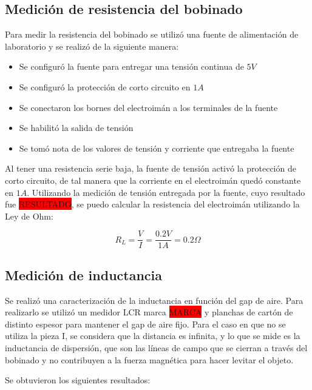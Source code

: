 \subsection{Medición de resistencia del bobinado}

\noindent Para medir la resistencia del bobinado se utilizó una fuente de alimentación de laboratorio y se realizó de la siguiente manera:

\begin{itemize}
	\item Se configuró la fuente para entregar una tensión continua de $5V$
	\item Se configuró la protección de corto circuito en $1A$
	\item Se conectaron los bornes del electroimán a los terminales de la fuente
	\item Se habilitó la salida de tensión
	\item Se tomó nota de los valores de tensión y corriente que entregaba la fuente
\end{itemize}

\noindent Al tener una resistencia serie baja, la fuente de tensión activó la protección de corto circuito, de tal manera que la corriente en el electroimán quedó constante en $1A$. Utilizando la medición de tensión entregada por la fuente, cuyo resultado fue \colorbox{red}{RESULTADO}, se puedo calcular la resistencia del electroimán utilizando la Ley de Ohm:

\begin{equation}
	R_{L}=\frac{V}{I}=\frac{0.2V}{1A}=0.2\Omega
\end{equation}

\subsection{Medición de inductancia}

\noindent Se realizó una caracterización de la inductancia en función del gap de aire. Para realizarlo se utilizó un medidor LCR marca \colorbox{red}{MARCA} y planchas de cartón de distinto espesor para mantener el gap de aire fijo. Para el caso en que no se utiliza la pieza I, se considera que la distancia es infinita, y lo que se mide es la inductancia de dispersión, que son las líneas de campo que se cierran a través del bobinado y no contribuyen a la fuerza magnética para hacer levitar el objeto.

\noindent Se obtuvieron los siguientes resultados:


